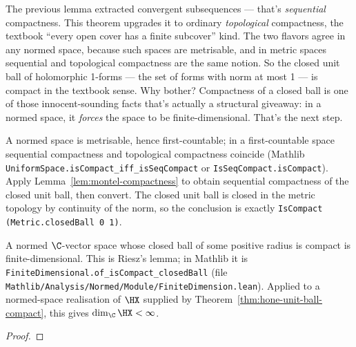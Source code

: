 \begin{layman}
The previous lemma extracted convergent subsequences — that's
\emph{sequential} compactness. This theorem upgrades it to ordinary
\emph{topological} compactness, the textbook ``every open cover has a
finite subcover'' kind. The two flavors agree in any normed space,
because such spaces are metrisable, and in metric spaces sequential and
topological compactness are the same notion. So the closed unit ball of
holomorphic 1-forms — the set of forms with norm at most 1 — is compact in
the textbook sense. Why bother? Compactness of a closed ball is one of
those innocent-sounding facts that's actually a structural giveaway: in
a normed space, it \emph{forces} the space to be finite-dimensional.
That's the next step.
\end{layman}

\begin{proofsketch}
A normed space is metrisable, hence first-countable; in a first-countable
space sequential compactness and topological compactness coincide
(Mathlib \texttt{UniformSpace.isCompact\_iff\_isSeqCompact} or
\texttt{IsSeqCompact.isCompact}). Apply
Lemma~\ref{lem:montel-compactness} to obtain sequential compactness of
the closed unit ball, then convert. The closed unit ball is closed in
the metric topology by continuity of the norm, so the conclusion is
exactly \texttt{IsCompact (Metric.closedBall 0 1)}.
\end{proofsketch}

\begin{theorem}
\label{thm:fd-from-riesz}
A normed \(\C\)-vector space whose closed ball of some positive radius
is compact is finite-dimensional. This is Riesz's lemma; in Mathlib it
is \texttt{FiniteDimensional.of\_isCompact\_closedBall} (file
\texttt{Mathlib/Analysis/Normed/Module/FiniteDimension.lean}). Applied
to a normed-space realisation of \(\HX\) supplied by
Theorem~\ref{thm:hone-unit-ball-compact}, this gives
\(\dim_{\C}\HX<\infty\).
\leanok
\end{theorem}
\begin{proof}\leanok\end{proof}

